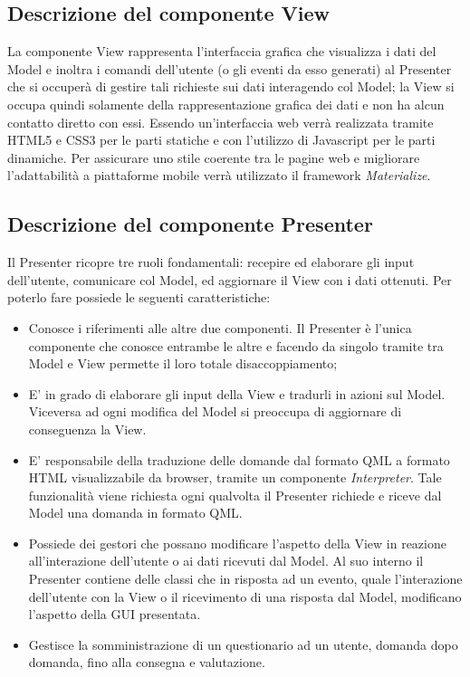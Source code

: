 \documentclass[a4paper,11pt]{article}
\begin{document}
	\subsection{Descrizione del componente View}
	La componente View rappresenta l'interfaccia grafica che visualizza i dati del Model e inoltra i comandi dell'utente (o gli eventi da esso generati) al Presenter che si occuperà di gestire tali richieste sui dati interagendo col Model; la View si occupa quindi solamente della rappresentazione grafica dei dati e non ha alcun contatto diretto con essi. Essendo un'interfaccia web verrà realizzata tramite HTML5 e CSS3 per le parti statiche e con l'utilizzo di Javascript per le parti dinamiche. Per assicurare uno stile coerente tra le pagine web e migliorare l'adattabilità a piattaforme mobile verrà utilizzato il framework \emph{Materialize}.
	\subsection{Descrizione del componente Presenter}
	Il Presenter ricopre tre ruoli fondamentali: recepire ed elaborare gli input dell'utente,
comunicare col Model, ed aggiornare il View con i dati ottenuti. Per poterlo fare possiede le seguenti caratteristiche:
	\begin{itemize}
		\item Conosce i riferimenti alle altre due componenti. Il Presenter è l'unica componente che conosce entrambe le altre e facendo da singolo tramite tra Model e View permette il loro totale disaccoppiamento;
		\item E' in grado di elaborare gli input della View e tradurli in azioni sul Model. Viceversa ad ogni modifica del Model si preoccupa di aggiornare di conseguenza la View.  
		\item E' responsabile della traduzione delle domande dal formato QML a formato HTML visualizzabile da browser, tramite un componente \emph{Interpreter}.  Tale funzionalità viene richiesta ogni qualvolta il Presenter richiede e riceve dal Model una domanda in formato QML.
		\item Possiede dei gestori che possano modificare l'aspetto della View in reazione all'interazione dell'utente o ai dati ricevuti dal Model. Al suo interno il Presenter contiene delle classi che in risposta ad un evento, quale l'interazione dell'utente con la View o il ricevimento di una risposta dal Model, modificano l'aspetto della GUI presentata.
		\item Gestisce la somministrazione di un questionario ad un utente, domanda dopo domanda, fino alla consegna e valutazione.
	\end{itemize}
	\newpage
\end{document}
